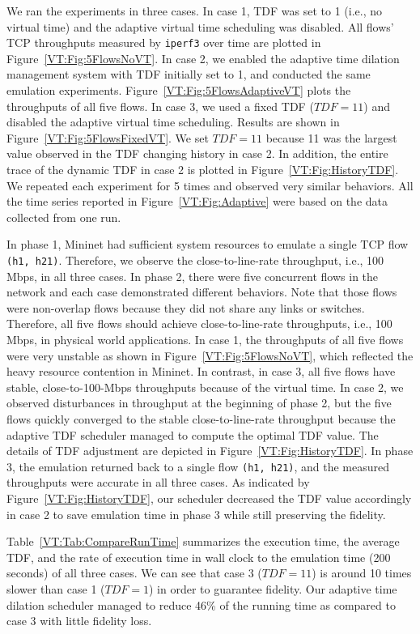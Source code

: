 We ran the experiments in three cases.
In case 1, TDF was set to 1 (i.e., no virtual time) and the adaptive virtual time scheduling was disabled.
All flows' TCP throughputs measured by \texttt{iperf3} over time are plotted in Figure~\ref{VT:Fig:5FlowsNoVT}. 
In case 2, we enabled the adaptive time dilation management system with TDF initially set to 1,
and conducted the same emulation experiments. Figure~\ref{VT:Fig:5FlowsAdaptiveVT} plots the throughputs of all five flows.
In case 3, we used a fixed TDF ($TDF = 11$) and disabled the adaptive virtual time scheduling.
Results are shown in Figure~\ref{VT:Fig:5FlowsFixedVT}.
We set $TDF=11$ because 11 was the largest value observed in the TDF changing history in case 2.
In addition, the entire trace of the dynamic TDF in case 2 is plotted in Figure~\ref{VT:Fig:HistoryTDF}.
We repeated each experiment for 5 times and observed very similar behaviors.
All the time series reported in Figure~\ref{VT:Fig:Adaptive} were based on the data collected from one run. 

In phase 1, Mininet had sufficient system resources to emulate a single TCP flow \texttt{(h1, h21)}.
Therefore, we observe the close-to-line-rate throughput, i.e., 100 Mbps, in all three cases.
In phase 2, there were five concurrent flows in the network and each case demonstrated different behaviors.
Note that those flows were non-overlap flows because they did not share any links or switches.
Therefore, all five flows should achieve close-to-line-rate throughputs, i.e., 100 Mbps, in physical world applications.
In case 1, the throughputs of all five flows were very unstable as shown in Figure~\ref{VT:Fig:5FlowsNoVT},
which reflected the heavy resource contention in Mininet.
In contrast, in case 3, all five flows have stable, close-to-100-Mbps throughputs because of the virtual time.
In case 2, we observed disturbances in throughput at the beginning of phase 2,
but the five flows quickly converged to the stable close-to-line-rate throughput because the adaptive TDF scheduler managed to compute the optimal TDF value.
The details of TDF adjustment are depicted in Figure~\ref{VT:Fig:HistoryTDF}.
In phase 3, the emulation returned back to a single flow \texttt{(h1, h21)}, and the measured throughputs were accurate in all three cases.
As indicated by Figure~\ref{VT:Fig:HistoryTDF}, our scheduler decreased the TDF value accordingly
in case 2 to save emulation time in phase 3 while still preserving the fidelity.

Table~\ref{VT:Tab:CompareRunTime} summarizes the execution time, the average TDF,
and the rate of execution time in wall clock to the emulation time (200 seconds) of all three cases. 
We can see that case 3 ($TDF = 11$) is around 10 times slower than case 1 ($TDF = 1$) in order to guarantee fidelity.
Our adaptive time dilation scheduler managed to reduce 46\% of the running time as compared to case 3 with little fidelity loss. 

